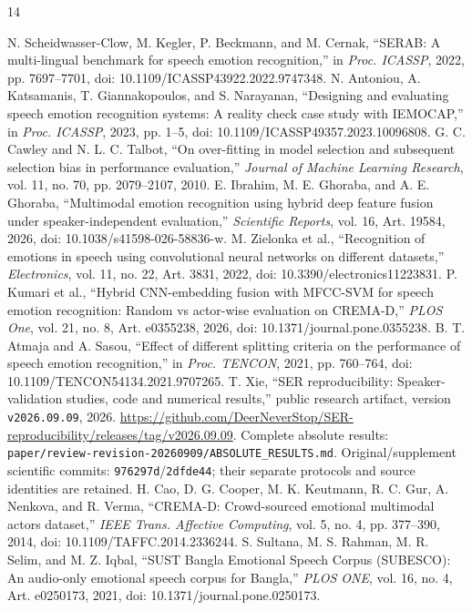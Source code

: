 \documentclass[letterpaper]{article}
\begin{document}
\begin{thebibliography}{14}
\raggedright
{} N. Scheidwasser-Clow, M. Kegler, P. Beckmann, and M. Cernak, ``SERAB: A multi-lingual benchmark for speech emotion recognition,'' in \emph{Proc. ICASSP}, 2022, pp. 7697--7701, doi: 10.1109/ICASSP43922.2022.9747348.
 N. Antoniou, A. Katsamanis, T. Giannakopoulos, and S. Narayanan, ``Designing and evaluating speech emotion recognition systems: A reality check case study with IEMOCAP,'' in \emph{Proc. ICASSP}, 2023, pp. 1--5, doi: 10.1109/ICASSP49357.2023.10096808.
 G. C. Cawley and N. L. C. Talbot, ``On over-fitting in model selection and subsequent selection bias in performance evaluation,'' \emph{Journal of Machine Learning Research}, vol. 11, no. 70, pp. 2079--2107, 2010.
 E. Ibrahim, M. E. Ghoraba, and A. E. Ghoraba, ``Multimodal emotion recognition using hybrid deep feature fusion under speaker-independent evaluation,'' \emph{Scientific Reports}, vol. 16, Art. 19584, 2026, doi: 10.1038/s41598-026-58836-w.
 M. Zielonka et al., ``Recognition of emotions in speech using convolutional neural networks on different datasets,'' \emph{Electronics}, vol. 11, no. 22, Art. 3831, 2022, doi: 10.3390/electronics11223831.
 P. Kumari et al., ``Hybrid CNN-embedding fusion with MFCC-SVM for speech emotion recognition: Random vs actor-wise evaluation on CREMA-D,'' \emph{PLOS One}, vol. 21, no. 8, Art. e0355238, 2026, doi: 10.1371/journal.pone.0355238.
 B. T. Atmaja and A. Sasou, ``Effect of different splitting criteria on the performance of speech emotion recognition,'' in \emph{Proc. TENCON}, 2021, pp. 760--764, doi: 10.1109/TENCON54134.2021.9707265.
 T. Xie, ``SER reproducibility: Speaker-validation studies, code and numerical results,'' public research artifact, version \texttt{v2026.09.09}, 2026. \url{https://github.com/DeerNeverStop/SER-reproducibility/releases/tag/v2026.09.09}. Complete absolute results: \texttt{paper/review-revision-20260909/}\allowbreak\texttt{ABSOLUTE\_RESULTS.md}. Original/supplement scientific commits: \texttt{976297d}/\texttt{2dfde44}; their separate protocols and source identities are retained.
 H. Cao, D. G. Cooper, M. K. Keutmann, R. C. Gur, A. Nenkova, and R. Verma, ``CREMA-D: Crowd-sourced emotional multimodal actors dataset,'' \emph{IEEE Trans. Affective Computing}, vol. 5, no. 4, pp. 377--390, 2014, doi: 10.1109/TAFFC.2014.2336244.
 S. Sultana, M. S. Rahman, M. R. Selim, and M. Z. Iqbal, ``SUST Bangla Emotional Speech Corpus (SUBESCO): An audio-only emotional speech corpus for Bangla,'' \emph{PLOS ONE}, vol. 16, no. 4, Art. e0250173, 2021, doi: 10.1371/journal.pone.0250173.

\end{thebibliography}
\end{document}
